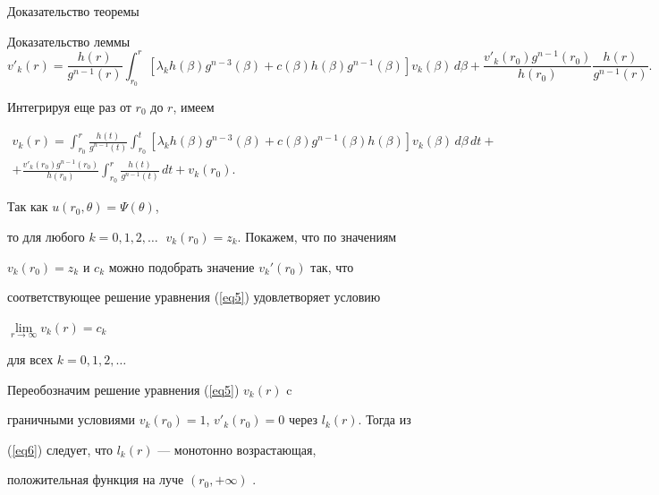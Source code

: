 \begin{pf*}{Доказательство теоремы}
\begin{pf*}{Доказательство леммы}
\begin{equation}


v'_k(r) = 


\frac{h(r)}{g^{n-1}(r)}\int_{r_0}^r[\lambda_k h(\beta)


g^{n-3}(\beta)+c(\beta)h(\beta)g^{n-1}(\beta)]v_k(\beta)\,d\beta+


\frac{v'_k(r_0)g^{n-1}(r_0)}{h(r_0)}\frac{h(r)}{g^{n-1}(r)}.


\label{eq6}


\end{equation}


Интегрируя еще раз от $r_0$ до $r$, имеем


\begin{multline}


v_k(r) = \int_{r_0}^r\frac{h(t)}{g^{n-1}(t)}\int_{r_0}^t[


\lambda_k h(\beta)g^{n-3}(\beta)+c(\beta)g^{n-1}(\beta)h(\beta)]v_k(\beta)\,


d\beta\,dt+\\


+\frac{v'_k(r_0)g^{n-1}(r_0)}{h(r_0)}\int_{r_0}^r \frac{h(t)}{g^{n-1}


(t)}\,dt+v_k(r_0).


\label{eq7a}


\end{multline}





Так как $u(r_0,\theta)=\Psi(\theta)$,


то для любого $k=0,1,2,\dotsc\;$ $v_k(r_0)=z_k$. Покажем, что по значениям


$v_k(r_0)=z_k$ и $c_k$ можно подобрать значение $v_k'(r_0)$ так, что


соответствующее решение уравнения (\ref{eq5}) удовлетворяет условию


$\lim\limits_{r\to \infty}v_k(r)=c_k$


для всех $k=0,1,2,\dotsc$





Переобозначим решение уравнения (\ref{eq5}) $v_k(r)$ c


граничными условиями $v_k(r_0)=1$, $v'_k(r_0)=0$ через  $l_k(r)$. Тогда из


(\ref{eq6}) следует, что $l_k(r)$ --- монотонно возрастающая,


положительная функция на луче $(r_0,+\infty)$ \cite{Los}.






\end{pf*}
\end{pf*}
